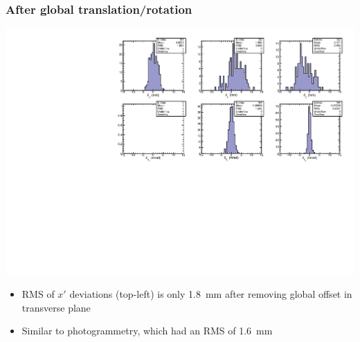 \documentclass[compress]{beamer}
\begin{document}
\begin{frame}
\frametitle{After global translation/rotation}

\includegraphics[width=\linewidth]{NovHardware_vs_tracks_as_histograms.pdf}

\begin{itemize}
\item RMS of $x'$ deviations (top-left) is only 1.8~mm after removing global offset in transverse plane

\item Similar to photogrammetry, which had an RMS of 1.6~mm
\end{itemize}
\end{frame}
\end{document}
